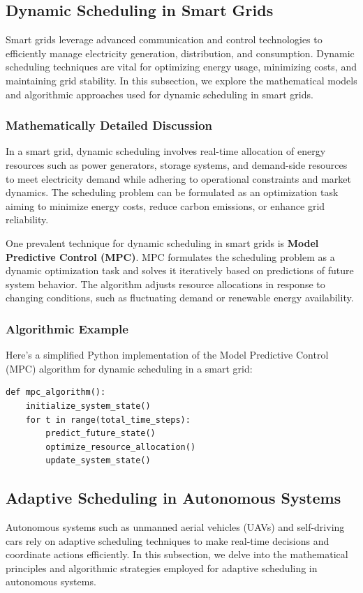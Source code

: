 \documentclass[12pt]{book} %
\begin{document}
\subsection{Dynamic Scheduling in Smart Grids}
Smart grids leverage advanced communication and control technologies to efficiently manage electricity generation, distribution, and consumption. Dynamic scheduling techniques are vital for optimizing energy usage, minimizing costs, and maintaining grid stability. In this subsection, we explore the mathematical models and algorithmic approaches used for dynamic scheduling in smart grids.

\subsubsection{Mathematically Detailed Discussion}
In a smart grid, dynamic scheduling involves real-time allocation of energy resources such as power generators, storage systems, and demand-side resources to meet electricity demand while adhering to operational constraints and market dynamics. The scheduling problem can be formulated as an optimization task aiming to minimize energy costs, reduce carbon emissions, or enhance grid reliability.

One prevalent technique for dynamic scheduling in smart grids is \textbf{Model Predictive Control (MPC)}. MPC formulates the scheduling problem as a dynamic optimization task and solves it iteratively based on predictions of future system behavior. The algorithm adjusts resource allocations in response to changing conditions, such as fluctuating demand or renewable energy availability.

\subsubsection{Algorithmic Example}
Here's a simplified Python implementation of the Model Predictive Control (MPC) algorithm for dynamic scheduling in a smart grid:
\FloatBarrier
\begin{lstlisting}
def mpc_algorithm():
    initialize_system_state()
    for t in range(total_time_steps):
        predict_future_state()
        optimize_resource_allocation()
        update_system_state()
\end{lstlisting}
\FloatBarrier

\subsection{Adaptive Scheduling in Autonomous Systems}
Autonomous systems such as unmanned aerial vehicles (UAVs) and self-driving cars rely on adaptive scheduling techniques to make real-time decisions and coordinate actions efficiently. In this subsection, we delve into the mathematical principles and algorithmic strategies employed for adaptive scheduling in autonomous systems.
\end{document}
